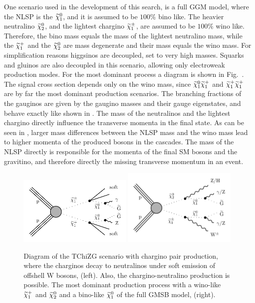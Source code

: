 One scenario used in the development of this search, is a full GGM model, where the NLSP is the $\widetilde{\chi}^{0}_{1}$, and it is assumed to be $100\%$ bino like. The heavier neutralino $\widetilde{\chi}^{0}_{2}$, and the lightest chargino $\widetilde{\chi}^\pm_{1}$, are assumed to be $100\%$ wino like. Therefore, the bino mass equals the mass of the lightest neutralino mass, while the $\widetilde{\chi}^{+}_{1}$ and the $\widetilde{\chi}^{0}_{2}$ are mass degenerate and their mass equals the wino mass. For simplification reasons higgsinos are decoupled, \ie set to very high masses. Squarks and gluinos are also decoupled in this scenario, allowing only electroweak production modes. For the most dominant process a diagram is shown in Fig.~. The signal cross section depends only on the wino mass, since $\widetilde{\chi}^{0}_{1}\widetilde{\chi}^{+}_{1}$ and $\widetilde{\chi}^{+}_{1}\widetilde{\chi}^{+}_{1}$ are by far the most dominant production scenarios. The branching fractions of the gauginos are given by the gaugino masses and their gauge eigenstates, and behave exactly like shown in . The mass of the neutralinos and the lightest chargino directly influence the transverse momenta in the final state. As can be seen in , larger mass differences between the NLSP mass and the wino mass lead to higher momenta of the produced bosons in the cascades. The mass of the NLSP directly is responsible for the momenta of the final SM bosons and the gravitino, and therefore directly the missing transverse momentum in an event.\\

\begin{figure}[hbtp]
 \centering
 \includegraphics[width=0.49\textwidth]{figures/signal/TChiNG}
 \includegraphics[width=0.49\textwidth]{figures/signal/gmsb}
 \caption{Diagram of the TChiZG scenario with chargino pair production, where the charginos decay to neutralinos under soft emission of offshell W bosons, (left). Also, the chargino-neutralino production is possible. The most dominant production process with a wino-like $\widetilde{\chi}^{+}_{1}$ and $\widetilde{\chi}^{0}_{2}$ and a bino-like $\widetilde{\chi}^{0}_{1}$ of the full GMSB model, (right).}
 \label{fig:ewkSMS}
\end{figure}



